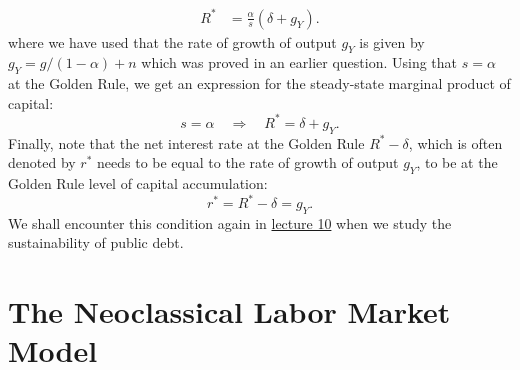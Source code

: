 \documentclass[]{book}
\theoremstyle{definition}
\theoremstyle{definition}
\theoremstyle{definition}
\theoremstyle{remark}
\begin{document}
\begin{enumerate}
\[\begin{aligned}
  R^{*}&=\frac{\alpha}{s}\left(\delta + g_Y\right).
  \end{aligned}
  \] where we have used that the rate of growth of output \(g_Y\) is
  given by \(g_Y = g/(1-\alpha)+n\) which was proved in an earlier
  question. Using that \(s=\alpha\) at the Golden Rule, we get an
  expression for the steady-state marginal product of capital:
  \[s= \alpha \quad \Rightarrow \quad \boxed{R^{*} = \delta + g_Y}.\]
  Finally, note that the net interest rate at the Golden Rule
  \(R^{*}-\delta\), which is often denoted by \(r^{*}\) needs to be
  equal to the rate of growth of output \(g_Y\), to be at the Golden
  Rule level of capital accumulation:
  \[\boxed{r^{*}=R^{*}-\delta=g_Y}.\] We shall encounter this condition
  again in \protect\hyperlink{public-debt}{lecture 10} when we study the
  sustainability of public debt.
\end{enumerate}

\section{The Neoclassical Labor Market
Model}\label{the-neoclassical-labor-market-model-1}
\end{document}
